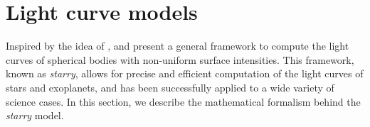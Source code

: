\documentclass[modern]{aastex631}
\begin{document}


\newpage
\section{Light curve models}\label{starry}

Inspired by the idea of \cite{pal2012}, \cite{starry} and \cite{Agol2020} present a general framework to compute the light curves of spherical bodies with non-uniform surface intensities. This framework, known as \textit{starry}, allows for precise and efficient computation of the light curves of stars and exoplanets, and has been successfully applied to a wide variety of science cases. In this section, we describe the mathematical formalism behind the \textit{starry} model.
\end{document}
